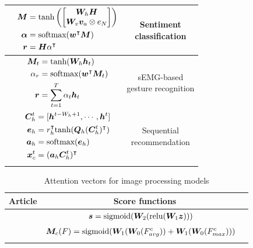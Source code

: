 \begin{longtable}{ccc}
    \cite{wang2016attention} & $\begin{aligned} {\boldsymbol{M}} &= \text{tanh} \left( \begin{bmatrix} {\boldsymbol{W}}_h {\boldsymbol{H}} \\ {\boldsymbol{W}}_v {\boldsymbol{v}}_a \otimes e_N \end{bmatrix} \right) \\  \boldsymbol{\alpha} &= \text{softmax}( {\boldsymbol{w}}^{\intercal} {\boldsymbol{M}} )  \\ {\boldsymbol{r}} &= {\boldsymbol{H}} \alpha^{\intercal}  \end{aligned}$ & \makecell{Sentiment\\classification} \\  \hline
    \cite{hu2018novel} & $\begin{aligned} {\boldsymbol{M}}_t &= \text{tanh}( {\boldsymbol{W}}_h {\boldsymbol{h}}_t) \\ \alpha_r &= \text{softmax}( {\boldsymbol{w}}^{\intercal} {\boldsymbol{M}}_t) \\ {\boldsymbol{r}} &= \sum_{t=1}^{T} \alpha_t {\boldsymbol{h}}_t  \end{aligned} $ & \makecell{sEMG-based\\gesture recognition} \\  \hline
    \cite{cui2019hierarchical} & $\begin{aligned} {\boldsymbol{C}}^t_h &=  [ {\boldsymbol{h}}^{t-W_h+1}, \cdots, {\boldsymbol{h}}^t] \\ {\boldsymbol{e}}_h &= r^{\intercal}_h \text{tanh}( {\boldsymbol{Q}}_h( {\boldsymbol{C}}^t_h )^{\intercal} ) \\ {\boldsymbol{a}}_h &= \text{softmax}({\boldsymbol{e}}_h) \\ {\boldsymbol{x}}^t_c &= ( {\boldsymbol{a}}_h {\boldsymbol{C}}^t_h)^{\intercal} \end{aligned}$  & \makecell{Sequential\\recommendation} \\  \hline
    \label{tab:rnn_attention_equations_study}
\end{longtable}



\begin{longtable}{cc}
    \caption{ Attention vectors for image processing models } \\
    \hline
    \textbf{Article} & \textbf{ \quad Score functions \quad } \\
    \hline
    \endhead
    \cite{hu2018squeeze} & $\begin{aligned} {\boldsymbol{s}} &= \text{sigmoid}( {\boldsymbol{W}}_2( \text{relu}( {\boldsymbol{W}}_1 {\boldsymbol{z}} )))    \end{aligned}$  \\  \hline
    \cite{woo2018cbam} & $\begin{aligned} {\boldsymbol{M}}_c(F) &= \text{sigmoid}( {\boldsymbol{W}}_1( {\boldsymbol{W}}_0( F^c_{avg} )) +  {\boldsymbol{W}}_1( {\boldsymbol{W}}_0(F^c_{max} ))) \end{aligned}$  \\  \hline    
    \label{tab:image_attention_equations_study}
\end{longtable}


